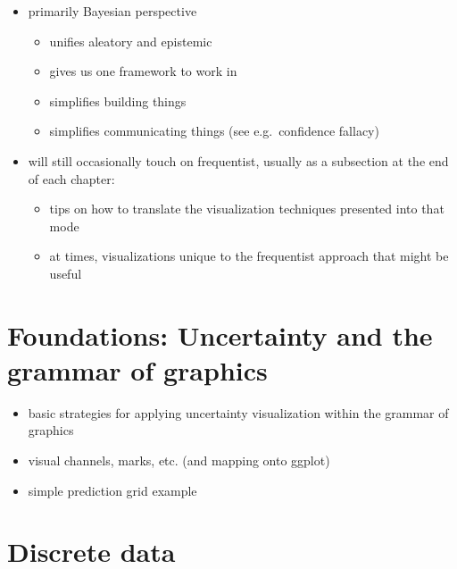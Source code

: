 \documentclass[]{book}
\providecommand{\tightlist}{%
  \setlength{\itemsep}{0pt}\setlength{\parskip}{0pt}}
\theoremstyle{definition}
\theoremstyle{definition}
\theoremstyle{definition}
\theoremstyle{remark}
\begin{document}
\begin{itemize}
\tightlist
\item
  primarily Bayesian perspective

  \begin{itemize}
  \tightlist
  \item
    unifies aleatory and epistemic
  \item
    gives us one framework to work in
  \item
    simplifies building things
  \item
    simplifies communicating things (see e.g.~confidence fallacy)
  \end{itemize}
\item
  will still occasionally touch on frequentist, usually as a subsection
  at the end of each chapter:

  \begin{itemize}
  \tightlist
  \item
    tips on how to translate the visualization techniques presented into
    that mode
  \item
    at times, visualizations unique to the frequentist approach that
    might be useful
  \end{itemize}
\end{itemize}

\hypertarget{ch-vis-foundations}{%
\chapter{Foundations: Uncertainty and the grammar of
graphics}\label{ch-vis-foundations}}

\begin{itemize}
\tightlist
\item
  basic strategies for applying uncertainty visualization within the
  grammar of graphics
\item
  visual channels, marks, etc. (and mapping onto ggplot)
\item
  simple prediction grid example
\end{itemize}

\hypertarget{ch-discrete}{%
\chapter{Discrete data}\label{ch-discrete}}
\end{document}
